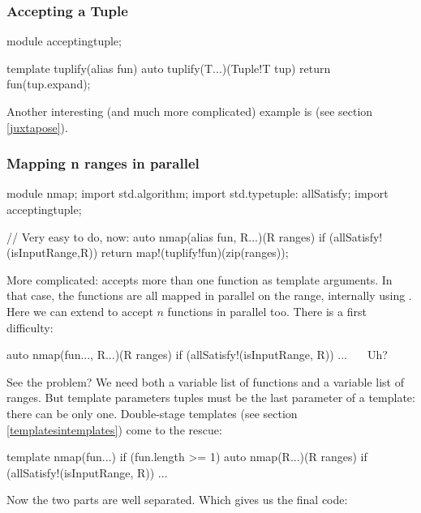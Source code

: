 \subsubsection{Accepting a Tuple}


\begin{dcode}
module acceptingtuple;

template tuplify(alias fun)
{
    auto tuplify(T...)(Tuple!T tup)
    {
        return fun(tup.expand);
    }
}
\end{dcode}

Another interesting (and much more complicated) example is  (see section \ref{juxtapose}).

\subsubsection{Mapping n ranges in parallel}\label{parallelmapping}

\begin{dcode}
module nmap;
import std.algorithm;
import std.typetuple: allSatisfy;
import acceptingtuple;

// Very easy to do, now:
auto nmap(alias fun, R...)(R ranges) if (allSatisfy!(isInputRange,R))
{
    return map!(tuplify!fun)(zip(ranges));
}
\end{dcode}

More complicated:  accepts more than one function as template arguments. In that case, the functions are all mapped in parallel on the range, internally using .
Here we can extend  to accept $n$ functions in parallel too. There is a first difficulty:

\begin{dcode}
auto nmap(fun..., R...)(R ranges) if (allSatisfy!(isInputRange, R))
{ ... }   ^^^^^^^^^^^^ Uh?
\end{dcode}

See the problem? We need both a variable list of functions and a variable list of ranges. But template parameters tuples must be the last parameter of a template: there can be only one. Double-stage templates (see section \ref{templatesintemplates}) come to the rescue:

\begin{dcode}
template nmap(fun...) if (fun.length >= 1)
{
    auto nmap(R...)(R ranges) if (allSatisfy!(isInputRange, R))
    {...}
}
\end{dcode}

Now the two parts are well separated. Which gives us the final code:

